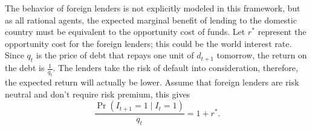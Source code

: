 The behavior of foreign lenders is not explicitly modeled in this framework, but as all rational agents, the expected marginal benefit of lending to the domestic country must be equivalent to the opportunity cost of funds.
Let $r^*$ represent the opportunity cost for the foreign lenders; this could be the world interest rate. Since $q_t$ is the price of debt that repays one unit of $d_{t+1}$ tomorrow, the return on the debt is $\frac{1}{q_t}$. The lenders take the risk of default into consideration, therefore, the expected return will actually be lower. Assume that foreign lenders are risk neutral and don't require risk premium, this gives
\begin{equation}
    \label{eq:lender}
    \frac{\Pr(I_{t+1}=1 \mid I_{t}=1)}{q_t} = 1 + r^* .
\end{equation}